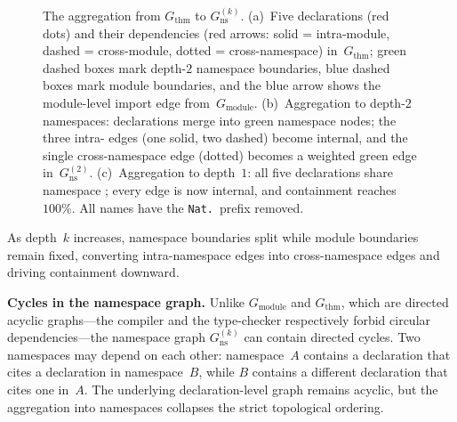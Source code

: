 \begin{figure}[ht]
\caption{The aggregation from $G_{\mathrm{thm}}$ to $G_{\mathrm{ns}}^{(k)}$. (a)~Five declarations (\textcolor{red!70!black}{red dots}) and their dependencies (\textcolor{red!70!black}{red arrows}: solid = intra-module, dashed = cross-module, dotted = cross-namespace) in~$G_{\mathrm{thm}}$; \textcolor{green!40!black}{green dashed boxes} mark depth-$2$ namespace boundaries, \textcolor{blue!60!black}{blue dashed boxes} mark module boundaries, and the \textcolor{blue!60!black}{blue arrow} shows the module-level import edge from~$G_{\mathrm{module}}$. (b)~Aggregation to depth-$2$ namespaces: declarations merge into \textcolor{green!50!black}{green namespace nodes}; the three intra- edges (one solid, two dashed) become internal, and the single cross-namespace edge (dotted) becomes a weighted \textcolor{green!50!black}{green edge} in~$G_{\mathrm{ns}}^{(2)}$. (c)~Aggregation to depth~$1$: all five declarations share namespace ; every edge is now internal, and containment reaches $100\%$. All names have the \texttt{Nat.}\ prefix removed.}
\label{fig:ns-aggregation-app}
\end{figure}

As depth~$k$ increases, namespace boundaries split while module boundaries remain fixed, converting intra-namespace edges into cross-namespace edges and driving containment downward.

\noindent\textbf{Cycles in the namespace graph.}
\label{rem:ns-cycles}
Unlike $G_{\mathrm{module}}$ and $G_{\mathrm{thm}}$, which are directed acyclic graphs---the compiler and the type-checker respectively forbid circular dependencies---the namespace graph $G_{\mathrm{ns}}^{(k)}$ can contain directed cycles. Two namespaces may depend on each other: namespace~$A$ contains a declaration that cites a declaration in namespace~$B$, while $B$ contains a different declaration that cites one in~$A$. The underlying declaration-level graph remains acyclic, but the aggregation into namespaces collapses the strict topological ordering.

